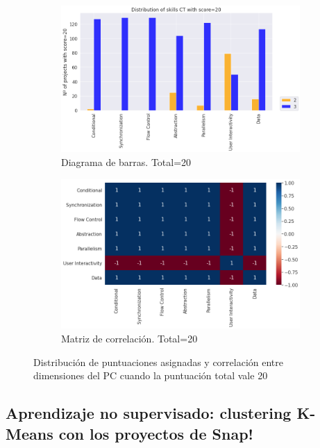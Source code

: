 \documentclass[a4paper, 12pt]{book}
\begin{document}
\begin{figure}[H]
    \centering
    \begin{subfigure}[h]{.49\textwidth} 
        \includegraphics[width=\textwidth]{img/distribucion_20_Snap}
        \caption{Diagrama de barras. Total=20}
        \label{fig:total20_Snap}
    \end{subfigure}       
    \begin{subfigure}[h]{.49\textwidth} 
        \includegraphics[width=\textwidth]{img/corr_20_Snap}
        \caption{Matriz de correlación. Total=20}
        \label{fig:corr20_Snap}
    \end{subfigure}
    \caption{Distribución de puntuaciones asignadas y correlación entre dimensiones del PC cuando la puntuación total vale 20}
\end{figure}


\subsection{Aprendizaje no supervisado: clustering K-Means con los proyectos de Snap!}
\label{subsec:kmeans_Snap}
\end{document}
